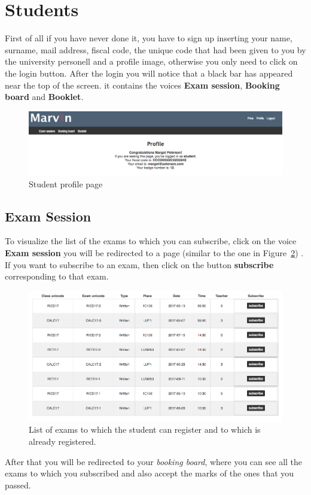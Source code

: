 \newpage
\section{Students}
First of all if you have never done it, you have to sign up inserting your name, surname, mail address, fiscal code, the unique code that had been given to you by the university personell and a profile image, otherwise you only need to click on the login button.
After the login you will notice that a black bar has appeared near the top of the screen. it contains the voices \textbf{Exam session}, \textbf{Booking board} and \textbf{Booklet}.

\begin{figure}[H]
	\centering
	\includegraphics[width=1.0\textwidth]{img/studentProfile.png}
	\caption{Student profile page }
	\label{fig:studentProfile}
\end{figure}

\subsection{Exam Session}
To visualize the list of the exams to which you can subscribe, click on the voice \textbf{Exam session} you will be redirected to a page (similar to the one in Figure~\ref{fig:studentExams}) . If you want to subscribe to an exam, then click on the button \textbf{subscribe} corresponding to that exam.
\begin{figure}[H]
\centering
\includegraphics[width=1.0\textwidth]{img/studentExams.png}
\caption{List of exams to which the student can register and to which is already registered.}
\label{fig:studentExams}
\end{figure}
After that you will be redirected to your \emph{booking board}, where you can see all the exams to which you subscribed and also accept the marks of the ones that you passed.

